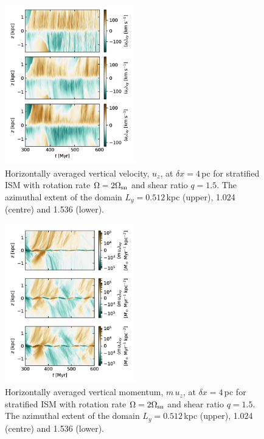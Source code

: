 \documentclass[iop,apj,numberedappendix,twocolappendix]{emulateapj}
\newcommand{\dx}{\delta x}
\begin{document}
\begin{figure}
\centering
\includegraphics[trim=0.0cm 0.0cm 0.0cm 0.0cm,clip=true,width=0.5\textwidth]{csc_figs/av-uzmzsm.pdf}
\caption{
Horizontally averaged vertical velocity, $u_z$, at $\dx=4$\,pc for 
stratified ISM with rotation rate $\Omega=2\Omega_{\rm sn}$ and shear ratio
$q=1.5$.
The azimuthal extent of the domain $L_y=0.512$\,kpc (upper), 1.024 (centre) 
and 1.536 (lower). 
\label{fig:lsd-uzmz}
}
\end{figure}

\begin{figure}
\centering
\includegraphics[trim=0.0cm 0.0cm 0.0cm 0.0cm,clip=true,width=0.5\textwidth]{csc_figs/av-ruzmzsm.pdf}
\caption{
Horizontally averaged vertical momentum, $m\,u_z$, at $\dx=4$\,pc for 
stratified ISM with rotation rate $\Omega=2\Omega_{\rm sn}$ and shear ratio
$q=1.5$.
The azimuthal extent of the domain $L_y=0.512$\,kpc (upper), 1.024 (centre) 
and 1.536 (lower). 
\label{fig:lsd-ruzmz}
}
\end{figure}
\end{document}
